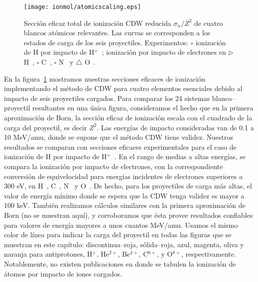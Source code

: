 \begin{figure}
\centering
\texttt{[image: ionmol/atomicscaling.eps]}
\caption[Sección eficaz total de ionización reducida de átomos relevantes.]
{Sección eficaz total de ionización CDW reducida $\sigma_{\alpha}/Z^2$ 
de cuatro blancos atómicos relevantes. Las curvas se corresponden a los 
estados de carga de los seis proyectiles. Experimentos: 
\mbox{\Large$\circ$} ionización de H por impacto de H$^+$~\cite{Shah:81};
ionización por impacto de electrones en $\rhd$ H~\cite{Shah:87}, 
$\square$ C~\cite{Brook:78}, $\square$ N~\cite{Brook:78} y 
$\triangle$ O~\cite{Thompson:95}.}
\label{fig:atomscaling}
\end{figure} 

En la figura~\ref{fig:atomscaling} mostramos nuestras secciones eficaces
de ionización implementando el método de CDW para cuatro elementos 
esenciales debido al impacto de seis proyectiles cargados. Para comparar 
los 24 sistemas blanco--proyectil resultantes en una única figura, 
consideramos el hecho que en la primera aproximación de Born, la sección 
eficaz de ionización escala con el cuadrado de la carga del proyectil, es 
decir $Z^{2}$. Las energías de impacto consideradas van de 0.1 a 10 MeV/amu, 
donde se supone que el método CDW tiene validez. Nuestros resultados se
comparan con secciones eficaces experimentales para el caso de ionización 
de H por impacto de H$^+$~\cite{Shah:81}. En el rango de medias a altas
energías, se compara la ionización por impacto de electrones, con la 
correspondiente conversión de equivelocidad para energías incidentes de 
electrones superiores a 300 eV, en H~\cite{Shah:87}, C~\cite{Brook:78}, 
N~\cite{Brook:78} y O~\cite{Thompson:95}. De hecho, para los proyectiles 
de carga más altas, el valor de energía mínimo donde se espera que la CDW 
tenga validez es mayor a 100 keV. También realizamos cálculos similares 
con la primera aproximación de Born (no se muestran aquí), y corroboramos 
que ésta provee resultados confiables para valores de energía mayores a 
unos cuantos MeV/amu. Usamos el mismo color de línea para indicar la 
carga del proyectil en todas las figuras que se muestran en este 
capítulo: discontinua--roja, sólida--roja, azul, magenta, oliva y naranja 
para antiprotones, H$^{+}$, He$^{2+}$, Be$^{4+}$, C$^{6+}$, y O$^{8+}$, 
respectivamente. Notablemente, no existen publicaciones en donde se
tabulen la ionización de átomos por impacto de iones cargados.

